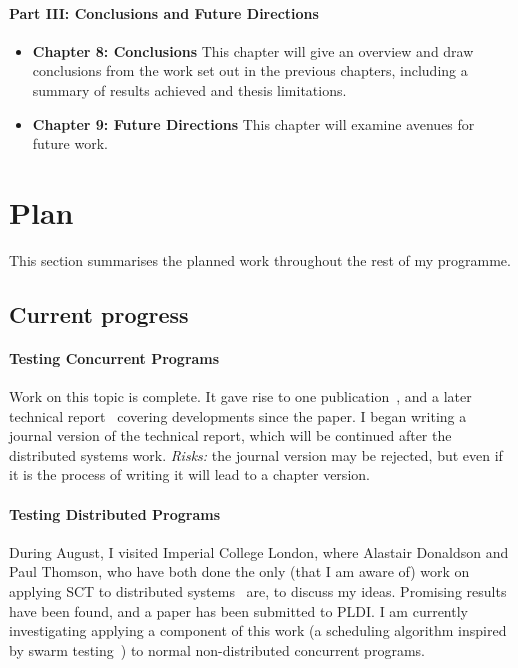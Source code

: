 \documentclass{article}
\begin{document}
\paragraph{Part III: Conclusions and Future Directions}
\begin{itemize}
\item \textbf{Chapter 8: Conclusions} This chapter will give an
  overview and draw conclusions from the work set out in the previous
  chapters, including a summary of results achieved and thesis
  limitations.
\item \textbf{Chapter 9: Future Directions} This chapter will
  examine avenues for future work.
\end{itemize}

\section{Plan}
\label{sec:plan}

This section summarises the planned work throughout the rest of my
programme.

\subsection{Current progress}

\paragraph{Testing Concurrent Programs} Work on this topic is
complete. It gave rise to one publication~\cite{walker2015}, and a
later technical report~\cite{YCS-2016-503} covering developments since
the paper. I began writing a journal version of the technical report,
which will be continued after the distributed systems
work. \emph{Risks:} the journal version may be rejected, but even if
it is the process of writing it will lead to a chapter version.

\paragraph{Testing Distributed Programs} During August, I visited
Imperial College London, where Alastair Donaldson and Paul Thomson,
who have both done the only (that I am aware of) work on applying SCT
to distributed systems~\cite{deligiannis2015,deligiannis2016} are, to
discuss my ideas. Promising results have been found, and a paper has
been submitted to PLDI. I am currently investigating applying a
component of this work (a scheduling algorithm inspired by swarm
testing~\cite{groce2012}) to normal non-distributed concurrent
programs.
\end{document}
